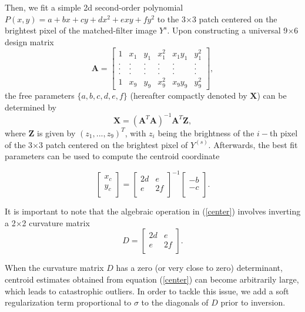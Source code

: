 \documentclass[onecolumn]{aastex61}
\newcommand{\beq}{\begin{equation}}
\newcommand{\eeq}{\end{equation}}
\begin{document}
Then, we fit a simple 2d second-order polynomial 
$P(x,y)=a+bx+cy+dx^2+exy+fy^2$ 
to the 3$\times$3 patch centered on the brightest pixel of the
matched-filter image $Y^{s}$.
Upon constructing a universal 9$\times$6 design matrix
\begin{equation}
    \mathbf{A} = 
    \begin{bmatrix}
        1 & x_{1} & y_{1} & x_{1}^{2} & x_{1}y_{1} & y_{1}^{2} \\
        . & . & . & . & . & .  \\
        . & . & . & . & . & .  \\
        . & . & . & . & . & .  \\
        1 & x_{9} & y_{9} & x_{9}^{2} & x_{9}y_{9} & y_{9}^{2}
    \end{bmatrix},
\end{equation}
the free parameters $\{a,b,c,d,e,f\}$
(hereafter compactly denoted by $\mathbf{X}$) can be determined by 
\beq
\mathbf{X} = (\mathbf{A}^{T}\mathbf{A})^{-1}\mathbf{A}^{T}\mathbf{Z},
\label{linearfit}
\eeq
where $\mathbf{Z}$ is given by $(z_{1},...,z_{9})^{T}$,
with $z_{i}$ being the brightness of the $i-$th pixel of the 3$\times$3 patch centered on the brightest pixel of $Y^{(s)}$.
Afterwards, the best fit parameters can be used to compute the centroid coordinate

\beq
  \begin{bmatrix}
      x_{c}\\
      y_{c}\\
  \end{bmatrix} = 
  \begin{bmatrix}
      2d & e\\
      e & 2f\\
  \end{bmatrix}^{-1}
  \begin{bmatrix}
      -b\\
      -c\\
  \end{bmatrix}.
\label{center}
\eeq

It is important to note that the algebraic operation in (\ref{center}) involves 
inverting a 2$\times$2 curvature matrix
\beq
  D = 
  \begin{bmatrix}
      2d & e\\
      e & 2f\\
  \end{bmatrix}.
\eeq

When the curvature matrix $D$ has a zero (or very close to zero) determinant,
centroid estimates obtained from equation (\ref{center}) can become arbitrarily 
large, which leads to catastrophic outliers. 
In order to tackle this issue, we add a soft regularization term
proportional to $\sigma$ to the diagonals of $D$ prior to inversion.
\end{document}
